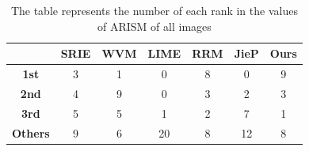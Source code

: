 \begin{table}[tb]
	\begin{center} 
	\caption{The table represents the number of each rank in the values of ARISM of all images}
	\begin{tabular}{c||c|c|c|c|c|c} \hline
	\backslashbox{\bf{Rank}}{\bf{Method}} & {SRIE} & {WVM} & {LIME} & {RRM} & {JieP} & {Ours} \\ \hline \hline
	\textbf{1st} & 3 & 1 & 0 & 8 & 0 & 9  \\ \hline
	\textbf{2nd} & 4 & 9 & 0 & 3 & 2 & 3 \\ \hline
	\textbf{3rd} & 5 & 5 & 1 & 2 & 7 & 1 \\ \hline
	\textbf{Others} & 9 & 6 & 20 & 8 & 12 & 8 \\ \hline
	\end{tabular} \label{tab:arism}
	\end{center}
\end{table}

